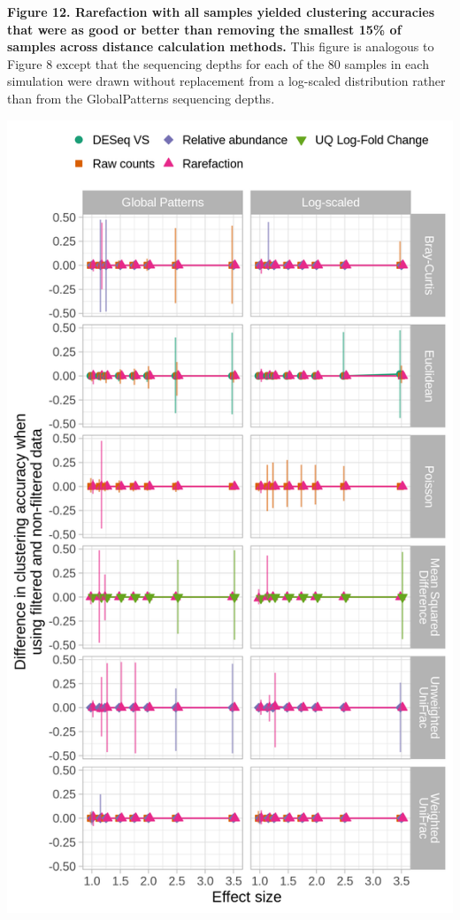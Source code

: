 \documentclass[
]{article}
\begin{document}
\textbf{Figure 12. Rarefaction with all samples yielded clustering
accuracies that were as good or better than removing the smallest 15\%
of samples across distance calculation methods.} This figure is
analogous to Figure 8 except that the sequencing depths for each of the
80 samples in each simulation were drawn without replacement from a
log-scaled distribution rather than from the GlobalPatterns sequencing
depths.

\newpage

\includegraphics{figure_13.png}
\end{document}

